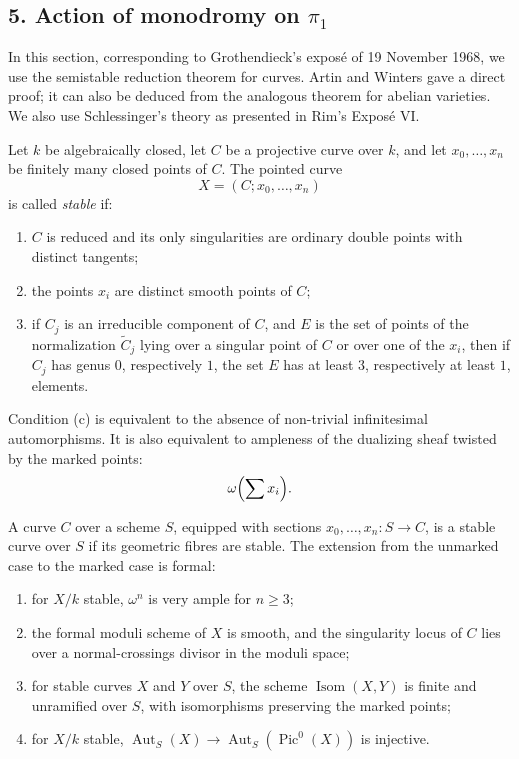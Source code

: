 \documentclass[12pt]{article}
\newcommand{\Aut}{\operatorname{Aut}}
\newcommand{\Isom}{\operatorname{Isom}}
\newcommand{\Pic}{\operatorname{Pic}}
\begin{document}
\subsection*{5. Action of monodromy on $\pi_1$}

In this section, corresponding to Grothendieck's exposé of 19 November 1968, we use the semistable reduction theorem for curves. Artin and Winters gave a direct proof; it can also be deduced from the analogous theorem for abelian varieties. We also use Schlessinger's theory as presented in Rim's Exposé VI.

Let $k$ be algebraically closed, let $C$ be a projective curve over $k$, and let $x_0,\ldots,x_n$ be finitely many closed points of $C$. The pointed curve
\[
X=(C;x_0,\ldots,x_n)
\]
is called \emph{stable} if:
\begin{enumerate}[label=(\alph*)]
\item $C$ is reduced and its only singularities are ordinary double points with distinct tangents;
\item the points $x_i$ are distinct smooth points of $C$;
\item if $C_j$ is an irreducible component of $C$, and $E$ is the set of points of the normalization $\widetilde C_j$ lying over a singular point of $C$ or over one of the $x_i$, then if $C_j$ has genus $0$, respectively $1$, the set $E$ has at least $3$, respectively at least $1$, elements.
\end{enumerate}
Condition (c) is equivalent to the absence of non-trivial infinitesimal automorphisms. It is also equivalent to ampleness of the dualizing sheaf twisted by the marked points:
\[
\omega\Bigl(\sum x_i\Bigr).
\]

A curve $C$ over a scheme $S$, equipped with sections $x_0,\ldots,x_n:S\to C$, is a stable curve over $S$ if its geometric fibres are stable. The extension from the unmarked case to the marked case is formal:
\begin{enumerate}[label=(\arabic*)]
\item for $X/k$ stable, $\omega^n$ is very ample for $n\geq3$;
\item the formal moduli scheme of $X$ is smooth, and the singularity locus of $C$ lies over a normal-crossings divisor in the moduli space;
\item for stable curves $X$ and $Y$ over $S$, the scheme $\Isom(X,Y)$ is finite and unramified over $S$, with isomorphisms preserving the marked points;
\item for $X/k$ stable, $\Aut_S(X)\to\Aut_S(\Pic^0(X))$ is injective.
\end{enumerate}
\end{document}
